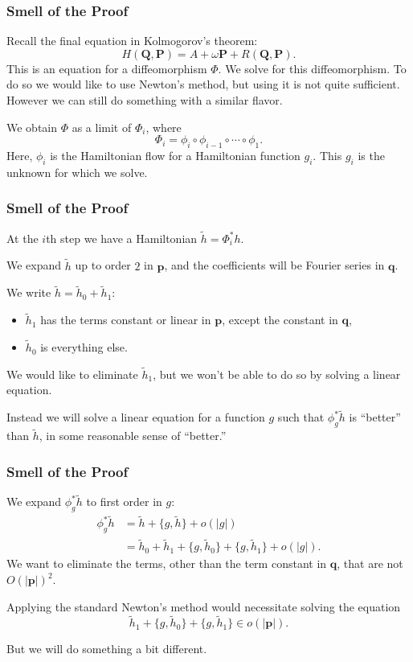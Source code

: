 \documentclass{beamer}
\newcommand{\bp}[1]{\bm{#1}}
\begin{document}
\begin{frame}
  \frametitle{Smell of the Proof}
  Recall the final equation in Kolmogorov's theorem:
  \begin{equation*}
    H(\bp{Q}, \bp{P}) = A + \omega \bp{P} + R (\bp{Q}, \bp{P}).
  \end{equation*}
  This is an equation for a diffeomorphism $\Phi$.
  We solve for this diffeomorphism.
  To do so we would like to use Newton's method, but using it is not quite
  sufficient.
  However we can still do something with a similar flavor.

  We obtain $\Phi$ as a limit of $\Phi_i$, where
  \begin{equation*}
    \Phi_i = \phi_i \circ \phi_{i-1} \circ \cdots \circ \phi_1.
  \end{equation*}
  Here, $\phi_i$ is the Hamiltonian flow for a Hamiltonian function $g_i$.
  This $g_i$ is the unknown for which we solve.
\end{frame}

\begin{frame}
  \frametitle{Smell of the Proof}
  At the $i$th step we have a Hamiltonian $\tilde{h} = \Phi_i^* h$.

  We expand $\tilde{h}$ up to order $2$ in $\bp{p}$, and the coefficients will
  be Fourier series in $\bp{q}$.

  We write $\tilde{h} = \tilde{h}_0 + \tilde{h}_1$:
  \begin{itemize}
  \item $\tilde{h}_1$ has the terms constant or linear in $\bp{p}$, except the
    constant in $\bp{q}$,
  \item $\tilde{h}_0$ is everything else.
  \end{itemize}
 
  We would like to eliminate $\tilde{h}_1$, but we won't be able to do so by
  solving a linear equation.

  Instead we will solve a linear equation for a function $g$ such that $\phi^*_g
  \tilde{h}$ is ``better'' than $\tilde{h}$, in some reasonable sense of
  ``better.''
\end{frame}

\begin{frame}
  \frametitle{Smell of the Proof}
  We expand $\phi^*_g \tilde{h}$ to first order in $g$:
  \begin{align*}
    \phi^*_g \tilde{h} &= \tilde{h} + \{g, \tilde{h}\} + o(|g|)\\
    &= \tilde{h}_0 + \tilde{h}_1 + \{g, \tilde{h}_0\} + \{g, \tilde{h}_1\} +
      o(|g|).
  \end{align*}
  We want to eliminate the terms, other than the term constant in $\bp{q}$, that
  are not $O(|\bp{p}|)^2$.

  Applying the standard Newton's method would necessitate solving the equation
  \begin{equation*}
    \tilde{h}_1 + \{g, \tilde{h}_0\} + \{g, \tilde{h}_1\} \in o(|\bp{p}|).
  \end{equation*}

  But we will do something a bit different.
\end{frame}
\end{document}
